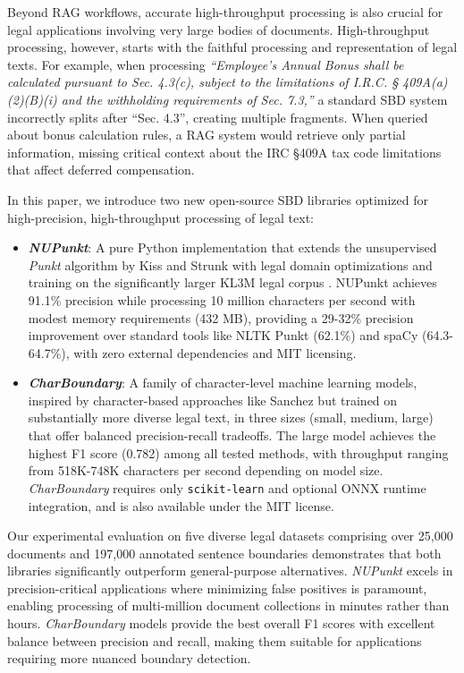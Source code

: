 Beyond RAG workflows, accurate high-throughput processing is also crucial for legal applications involving very large bodies of documents.  High-throughput processing, however, starts with the faithful processing and representation of legal texts.  For example, when processing \textit{``Employee's Annual Bonus shall be calculated pursuant to Sec. 4.3(c), subject to the limitations of I.R.C. § 409A(a)(2)(B)(i) and the withholding requirements of Sec. 7.3,''} a standard SBD system incorrectly splits after ``Sec. 4.3'', creating multiple fragments. When queried about bonus calculation rules, a RAG system would retrieve only partial information, missing critical context about the IRC §409A tax code limitations that affect deferred compensation.

In this paper, we introduce two new open-source SBD libraries optimized for high-precision, high-throughput processing of legal text:
\\
\begin{itemize}
    \item \textbf{\textit{NUPunkt}}: A pure Python implementation that extends the unsupervised \textit{Punkt} algorithm by Kiss and Strunk \cite{kiss2006unsupervised} with legal domain optimizations and training on the significantly larger KL3M legal corpus \cite{kl3m-data}. NUPunkt achieves 91.1\% precision while processing 10 million characters per second with modest memory requirements (432 MB), providing a 29-32\% precision improvement over standard tools like NLTK Punkt (62.1\%) and spaCy (64.3-64.7\%), with zero external dependencies and MIT licensing.
    \\
    \item \textbf{\textit{CharBoundary}}: A family of character-level machine learning models, inspired by character-based approaches like Sanchez \cite{sanchez2019sentence} but trained on substantially more diverse legal text, in three sizes (small, medium, large) that offer balanced precision-recall tradeoffs. The large model achieves the highest F1 score (0.782) among all tested methods, with throughput ranging from 518K-748K characters per second depending on model size. \textit{CharBoundary} requires only \texttt{scikit-learn} and optional ONNX runtime integration, and is also available under the MIT license.
\end{itemize}

Our experimental evaluation on five diverse legal datasets comprising over 25,000 documents and 197,000 annotated sentence boundaries demonstrates that both libraries significantly outperform general-purpose alternatives. \textit{NUPunkt} excels in precision-critical applications where minimizing false positives is paramount, enabling processing of multi-million document collections in minutes rather than hours. \textit{CharBoundary} models provide the best overall F1 scores with excellent balance between precision and recall, making them suitable for applications requiring more nuanced boundary detection.

